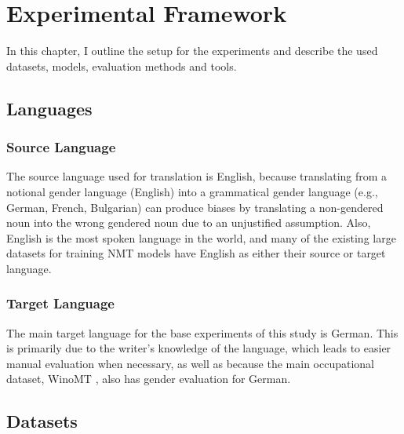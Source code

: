 \chapter{Experimental Framework}
\label{ch:Experiments}

In this chapter, I outline the setup for the experiments and describe the used datasets, models, evaluation methods and tools.

\section{Languages}
\label{sec:Experiments:Languages}


\subsection{Source Language} 
The source language used for translation is English, because translating from a notional gender language (English) into a grammatical gender language (e.g., German, French, Bulgarian) can produce biases by translating a non-gendered noun into the wrong gendered noun due to an unjustified assumption. Also, English is the most spoken language in the world, and many of the existing large datasets for training NMT models have English as either their source or target language.

\subsection{Target Language} 
The main target language for the base experiments of this study is German. This is primarily due to the writer's knowledge of the language, which leads to easier manual evaluation when necessary, as well as because the main occupational dataset, WinoMT \parencite{Stanovsky_2019}, also has gender evaluation for German.


\section{Datasets}
\label{sec:Experiments:Datasets}

